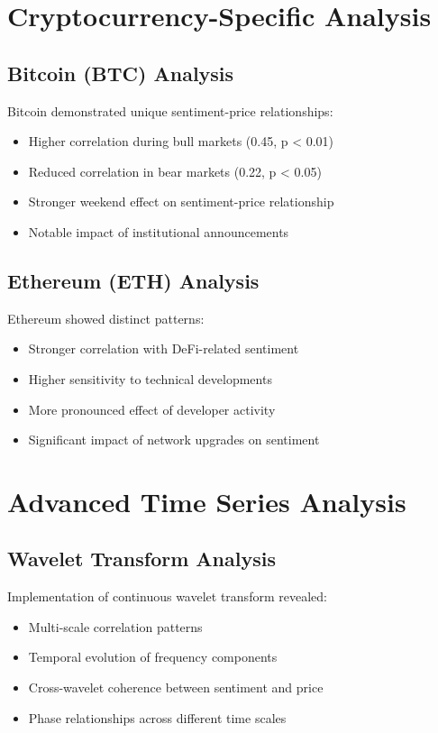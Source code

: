 \documentclass[12pt,a4paper]{report}
\begin{document}
\section{Cryptocurrency-Specific Analysis}
\subsection{Bitcoin (BTC) Analysis}
Bitcoin demonstrated unique sentiment-price relationships:
\begin{itemize}
    \item Higher correlation during bull markets (0.45, p < 0.01)
    \item Reduced correlation in bear markets (0.22, p < 0.05)
    \item Stronger weekend effect on sentiment-price relationship
    \item Notable impact of institutional announcements
\end{itemize}

\subsection{Ethereum (ETH) Analysis}
Ethereum showed distinct patterns:
\begin{itemize}
    \item Stronger correlation with DeFi-related sentiment
    \item Higher sensitivity to technical developments
    \item More pronounced effect of developer activity
    \item Significant impact of network upgrades on sentiment
\end{itemize}

\section{Advanced Time Series Analysis}
\subsection{Wavelet Transform Analysis}
Implementation of continuous wavelet transform revealed:
\begin{itemize}
    \item Multi-scale correlation patterns
    \item Temporal evolution of frequency components
    \item Cross-wavelet coherence between sentiment and price
    \item Phase relationships across different time scales
\end{itemize}
\end{document}
